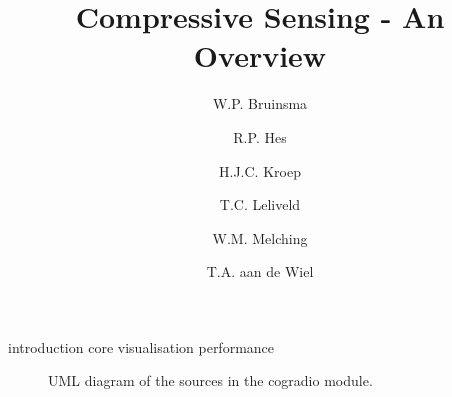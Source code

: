 \documentclass[a4paper, openany, oneside]{memoir}
\title{Compressive Sensing - An Overview}
\author{W.P. Bruinsma \and R.P. Hes \and H.J.C. Kroep \and T.C. Leliveld \and W.M. Melching \and T.A. aan de Wiel}
\begin{document}
{introduction}
{core}
{visualisation}
{performance}

\begin{sidewaysfigure}[]
    \centering
    \resizebox{\textwidth}{!}{
        
    }
    \caption{UML diagram of the sources in the cogradio module.}
    \label{fig:name}
\end{sidewaysfigure}
\end{document}
